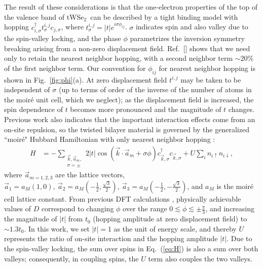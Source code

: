 \documentclass[%
reprint,
superscriptaddress,
twocolumn,
 amsmath,amssymb,
 aps,
 prb,
]{revtex4-2}
\newcommand{\twsetwo}{tWSe$_2$}
\begin{document}
The result of these considerations is that the one-electron properties of the top of the valence band of \twsetwo~can be described by a tight binding model with hopping $c_{i, \sigma}^{\dagger} t^{i,j}_{\sigma}  c_{j, \sigma}$, where $t^{i,j}_{\sigma}=|t|e^{i\sigma\phi_{ij}}$. $\sigma$ indicates spin and also valley due to the spin-valley locking, and the phase $\phi$ parametrizes the inversion symmetry breaking arising from a non-zero displacement field.
Ref.~[] shows that we need only to retain the nearest neighbor hopping, with a second neighbor term  $\sim 20\%$  of the first neighbor term. Our convention for $\phi_{ij}$ for nearest neighbor hopping is shown in Fig.~\ref{fig:phi}(a). At zero displacement field $t^{i,j}$ may be taken to be independent of $\sigma$ (up to terms of order of the inverse of the number of atoms in the moir\'e unit cell, which we neglect); as the displacement field is increased, the spin dependence of $t$ becomes more pronounced and the magnitude of $t$ changes. Previous work also indicates that the important interaction effects come from an on-site repulsion, so the twisted bilayer material is governed by the generalized ``moir\'e" Hubbard Hamiltonian with only nearest neighbor hopping \cite{wu2018hubbard,PhysRevResearch.2.033087}:
\begin{align}
	H&=-\sum_{\substack{\vec{k},\vec{a}_{m},\\ \sigma=\pm}}2|t|\cos (\vec{k} \cdot \vec{a}_{m}+\sigma \phi)c^{\dagger}_{\vec{k},\sigma}c_{\vec{k},\sigma}+U \sum_{i} n_{i \uparrow} n_{i \downarrow},
	\label{eq:H}
\end{align}
where $\vec{a}_{m=1,2,3}$ are the lattice vectors, $\vec{a}_1=a_M(1,0),~\vec{a}_2=a_M(-\frac{1}{2},\frac{\sqrt{3}}{2}),~\vec{a}_3=a_M(-\frac{1}{2},-\frac{\sqrt{3}}{2})$, and $a_M$ is the moir\'e cell lattice constant.  From previous DFT calculations \cite{Wang:2020us}, physically achievable values of $D$ correspond to changing $\phi$ over the range $0\lesssim\phi\lesssim \pm\frac{\pi}{3}$, and increasing the magnitude of $|t|$ from $t_0$ (hopping amplitude at zero displacement field) to $\sim1.3 t_0$. In this work, we set $|t|=1$ as the unit of energy scale, and thereby $U$ represents the ratio of on-site interaction and the hopping amplitude $|t|$. Due to the spin-valley locking, the sum over spins in Eq.~(\ref{eq:H}) is also a sum over both valleys; consequently, in coupling spins, the $U$ term also couples the two valleys.
\end{document}
